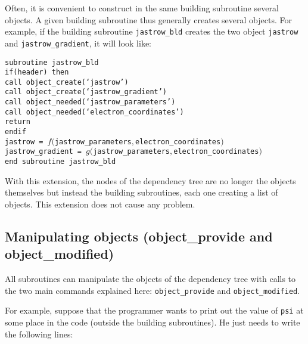 \documentclass[a4paper,11pt]{article}
\begin{document}
\vspace{1em}
Often, it is convenient to construct in the same building subroutine several objects. A given building subroutine thus generally creates several objects. For example, if the building subroutine {\tt jastrow_bld} creates the two object {\tt jastrow} and {\tt jastrow_gradient}, it will look like:

\vspace{0.5cm}
\noindent
{\tt subroutine jastrow_bld\\
if(header) then\\
\phantom{xx} call object_create(`jastrow')\\
\phantom{xx} call object_create(`jastrow_gradient')\\
\phantom{xx} call object_needed(`jastrow_parameters')\\
\phantom{xx} call object_needed(`electron_coordinates')\\
\phantom{xx} return\\
endif\\
jastrow  = $f(${\tt jastrow_parameters}$,${\tt electron_coordinates}$)$\\
jastrow_gradient  = $g(${\tt jastrow_parameters}$,${\tt electron_coordinates}$)$\\
end subroutine jastrow_bld}

\vspace{0.5cm}
With this extension, the nodes of the dependency tree are no longer the objects themselves but instead the building subroutines, each one creating a list of objects. This extension does not cause any problem.

\subsection{Manipulating objects (object_provide and object_modified)}

All subroutines can manipulate the objects of the dependency tree with calls to the two main commands explained here: {\tt object_provide} and {\tt object_modified}.

\vspace{1em}

For example, suppose that the programmer wants to print out the value of {\tt psi} at some place in the code (outside the building subroutines). He just needs to write the following lines:
\end{document}
